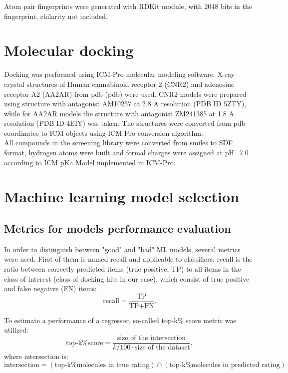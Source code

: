 Atom pair fingerprints were generated with RDKit module, with 2048 bits in the fingerprint, chilarity not included.

\section{Molecular docking}
Docking was performed using ICM-Pro molecular modeling software.
X-ray crystal structures of Human cannabinoid receptor 2 (CNR2) and adenosine receptor A2 (AA2AR) from \acrlong{pdb} (\acrshort{pdb}) were used.
CNR2 models were prepared using structure with antagonist AM10257 at 2.8 A resolution (PDB ID 5ZTY), while for AA2AR models the structure with antagonist ZM241385 at 1.8 A resolution (PDB ID 4EIY) was taken.
The structures were converted from \acrshort{pdb} coordinates to ICM objects using ICM-Pro conversion algorithm.\\

All compounds in the screening library were converted from \acrshort{smiles} to SDF format, hydrogen atoms were built and formal charges were assigned at pH=7.0 according to ICM pKa Model implemented in ICM-Pro.

\section{Machine learning model selection}

\subsection{Metrics for models performance evaluation}
In order to distinguish between "good" and "bad" ML models, several metrics were used.
First of them is named recall and applicable to classifiers: recall is the ratio between correctly predicted items (true positive, TP) to all items in the class of interest (class of docking hits in our case), which consist of true positive and false negative (FN) items:
\begin{equation*}
    \text{recall} = \frac{\text{TP}}{\text{TP} + \text{FN}}.
\end{equation*}

To estimate a performance of a regressor, so-called top-k\% score metric was utilized:
\begin{equation*}
\text{top-k\% score} = \frac{\text{size of the intersection}}{k/100 \cdot \text{size of the dataset}},
\end{equation*}
where intersection is:
\begin{equation*}
         \text{intersection} = \left( \text{top-k\% molecules in true rating}\right) \cap \left( \text{top-k\% molecules in predicted rating}\right)
\end{equation*}


